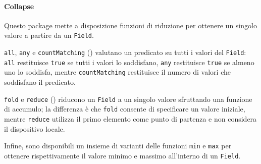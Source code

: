 



\paragraph{Collapse} Questo package mette a disposizione funzioni di riduzione per ottenere un singolo valore a partire da un \texttt{Field}.

\texttt{all}, \texttt{any} e \texttt{countMatching} () valutano un predicato su tutti i valori del \texttt{Field}: \texttt{all} restituisce \texttt{true} se tutti i valori lo soddisfano, \texttt{any} restituisce \texttt{true} se almeno uno lo soddisfa, mentre \texttt{countMatching} restituisce il numero di valori che soddisfano il predicato.

\texttt{fold} e \texttt{reduce} () riducono un \texttt{Field} a un singolo valore sfruttando una funzione di accumulo; la differenza è che \texttt{fold} consente di specificare un valore iniziale, mentre \texttt{reduce} utilizza il primo elemento come punto di partenza e non considera il dispositivo locale.

Infine, sono disponibili un insieme di varianti delle funzioni \texttt{min} e \texttt{max} per ottenere rispettivamente il valore minimo e massimo all’interno di un \texttt{Field}.



\newpage


